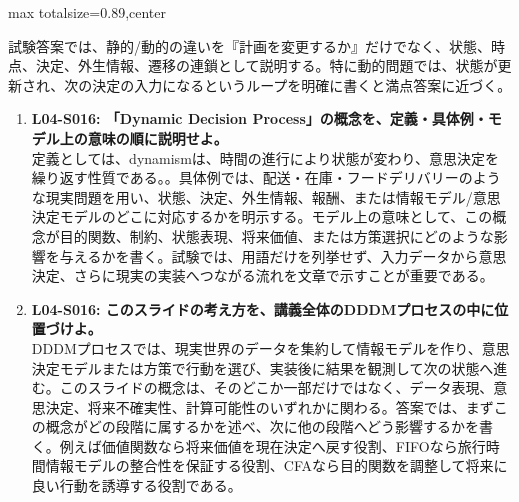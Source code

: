 \begin{minipage}[t]{0.58\textwidth}
\begin{adjustbox}{max totalsize={\textwidth}{0.89\textheight},center}
\begin{minipage}{\textwidth}
試験答案では、静的/動的の違いを『計画を変更するか』だけでなく、状態、時点、決定、外生情報、遷移の連鎖として説明する。特に動的問題では、状態が更新され、次の決定の入力になるというループを明確に書くと満点答案に近づく。\par{}\begin{enumerate}\item \textbf{L04-S016: 「Dynamic Decision Process」の概念を、定義・具体例・モデル上の意味の順に説明せよ。}\\定義としては、dynamismは、時間の進行により状態が変わり、意思決定を繰り返す性質である。。具体例では、配送・在庫・フードデリバリーのような現実問題を用い、状態、決定、外生情報、報酬、または情報モデル/意思決定モデルのどこに対応するかを明示する。モデル上の意味として、この概念が目的関数、制約、状態表現、将来価値、または方策選択にどのような影響を与えるかを書く。試験では、用語だけを列挙せず、入力データから意思決定、さらに現実の実装へつながる流れを文章で示すことが重要である。\item \textbf{L04-S016: このスライドの考え方を、講義全体のDDDMプロセスの中に位置づけよ。}\\DDDMプロセスでは、現実世界のデータを集約して情報モデルを作り、意思決定モデルまたは方策で行動を選び、実装後に結果を観測して次の状態へ進む。このスライドの概念は、そのどこか一部だけではなく、データ表現、意思決定、将来不確実性、計算可能性のいずれかに関わる。答案では、まずこの概念がどの段階に属するかを述べ、次に他の段階へどう影響するかを書く。例えば価値関数なら将来価値を現在決定へ戻す役割、FIFOなら旅行時間情報モデルの整合性を保証する役割、CFAなら目的関数を調整して将来に良い行動を誘導する役割である。\end{enumerate}
\end{minipage}
\end{adjustbox}
\end{minipage}


